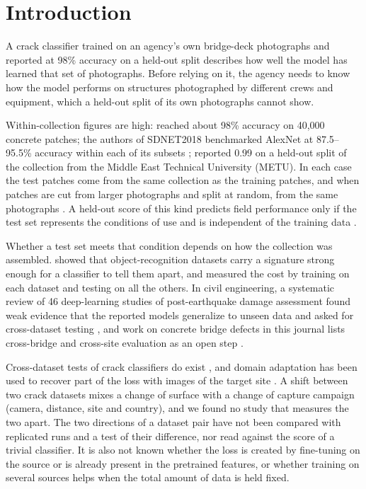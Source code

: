 \documentclass[pdflatex,sn-apa]{sn-jnl}
\begin{document}
\maketitle

\section{Introduction}\label{sec:intro}

A crack classifier trained on an agency's own bridge-deck photographs and reported at 98\% accuracy on a held-out split describes how well the model has learned that set of photographs. Before relying on it, the agency needs to know how the model performs on structures photographed by different crews and equipment, which a held-out split of its own photographs cannot show.

Within-collection figures are high: \citet{cha2017} reached about 98\% accuracy on 40,000 concrete patches; the authors of SDNET2018 benchmarked AlexNet at 87.5--95.5\% accuracy within each of its subsets \citep{dorafshan2018sdnet}; \citet{ozgenel2018} reported 0.99 on a held-out split of the collection from the Middle East Technical University (METU). In each case the test patches come from the same collection as the training patches, and when patches are cut from larger photographs and split at random, from the same photographs \citep{kapoor2023, abeysuriya2026}. A held-out score of this kind predicts field performance only if the test set represents the conditions of use and is independent of the training data \citep{hasan2025}.

Whether a test set meets that condition depends on how the collection was assembled. \citet{torralba2011} showed that object-recognition datasets carry a signature strong enough for a classifier to tell them apart, and measured the cost by training on each dataset and testing on all the others. In civil engineering, a systematic review of 46 deep-learning studies of post-earthquake damage assessment found weak evidence that the reported models generalize to unseen data and asked for cross-dataset testing \citep{abeysuriya2026}, and work on concrete bridge defects in this journal lists cross-bridge and cross-site evaluation as an open step \citep{lateef2026}.

Cross-dataset tests of crack classifiers do exist \citep{ozgenel2018, rashid2025}, and domain adaptation has been used to recover part of the loss with images of the target site \citep{santos2022, zhu2026concracknet}. A shift between two crack datasets mixes a change of surface with a change of capture campaign (camera, distance, site and country), and we found no study that measures the two apart. The two directions of a dataset pair have not been compared with replicated runs and a test of their difference, nor read against the score of a trivial classifier. It is also not known whether the loss is created by fine-tuning on the source or is already present in the pretrained features, or whether training on several sources helps when the total amount of data is held fixed.
\end{document}
